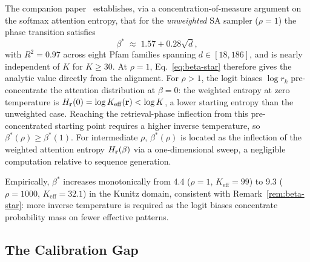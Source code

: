 \begin{remark}\label{rem:beta-star}
The companion paper~\cite{varnerSAProtein2026} establishes, via a concentration-of-measure
argument on the softmax attention entropy, that for the \emph{unweighted} SA sampler ($\rho=1$)
the phase transition satisfies
\begin{equation}\label{eq:beta-star}
  \beta^{*} \;\approx\; 1.57 + 0.28\sqrt{d},
\end{equation}
with $R^{2}=0.97$ across eight Pfam families spanning $d \in [18, 186]$, and is nearly
independent of $K$ for $K \geq 30$.
At $\rho=1$, Eq.~\eqref{eq:beta-star} therefore gives the analytic value directly from the
alignment. For $\rho > 1$, the logit biases $\log r_k$ pre-concentrate the attention
distribution at $\beta=0$: the weighted entropy at zero temperature is $H_{\mathbf{r}}(0) = \log
K_{\mathrm{eff}}(\mathbf{r}) < \log K$, a lower starting entropy than the unweighted case.
Reaching the retrieval-phase inflection from this pre-concentrated starting point requires
a higher inverse temperature, so $\beta^{*}(\rho) \geq \beta^{*}(1)$.
For intermediate $\rho$, $\beta^{*}(\rho)$ is located as the inflection of the weighted
attention entropy $H_{\mathbf{r}}(\beta)$ via a one-dimensional sweep, a negligible computation
relative to sequence generation.
\end{remark}

Empirically, $\beta^{*}$ increases monotonically from 4.4 ($\rho = 1$, $K_{\mathrm{eff}} = 99$)
to 9.3 ($\rho = 1000$, $K_{\mathrm{eff}} = 32.1$) in the Kunitz domain, consistent with
Remark~\ref{rem:beta-star}: more inverse temperature is required as the logit biases concentrate
probability mass on fewer effective patterns.

\subsection{The Calibration Gap}\label{sec:gap}

